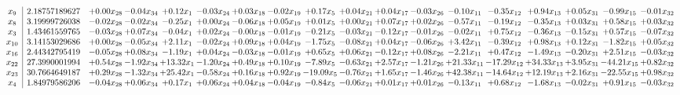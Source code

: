 \documentclass[9pt]{article}
\begin{document}
 \[\begin{array}{c| c c@{\hskip 2pt} c@{\hskip 2pt} c@{\hskip 2pt} c@{\hskip 2pt} c@{\hskip 2pt} c@{\hskip 2pt} c@{\hskip 2pt} c@{\hskip 2pt} c@{\hskip 2pt} c@{\hskip 2pt} c@{\hskip 2pt} c@{\hskip 2pt} c@{\hskip 2pt} c@{\hskip 2pt} c@{\hskip 2pt} c@{\hskip 2pt} }
 x_{9}   &  2.18757189627 & +  0.00 x_{28} & -0.04 x_{34} & +  0.12 x_{1} & -0.03 x_{24} & +  0.03 x_{18} & -0.02 x_{19} & +  0.17 x_{5} & +  0.04 x_{21} & +  0.04 x_{17} & -0.03 x_{26} & -0.10 x_{11} & -0.35 x_{12} & +  0.94 x_{13} & +  0.05 x_{31} & -0.99 x_{15} & -0.01 x_{32}\\
 x_{8}   &  3.19999726038 & -0.02 x_{28} & -0.02 x_{34} & -0.25 x_{1} & +  0.00 x_{24} & -0.06 x_{18} & +  0.05 x_{19} & +  0.01 x_{5} & +  0.00 x_{21} & +  0.07 x_{17} & +  0.02 x_{26} & -0.57 x_{11} & -0.19 x_{12} & -0.35 x_{13} & +  0.03 x_{31} & +  0.58 x_{15} & +  0.03 x_{32}\\
 x_{3}   &  1.43461559765 & -0.03 x_{28} & +  0.07 x_{34} & -0.04 x_{1} & +  0.02 x_{24} & -0.00 x_{18} & -0.01 x_{19} & -0.21 x_{5} & -0.03 x_{21} & -0.12 x_{17} & -0.01 x_{26} & -0.02 x_{11} & +  0.75 x_{12} & -0.36 x_{13} & -0.15 x_{31} & +  0.57 x_{15} & -0.07 x_{32}\\
 x_{10}   &  3.14153029686 & +  0.00 x_{28} & -0.05 x_{34} & +  2.11 x_{1} & -0.02 x_{24} & +  0.09 x_{18} & +  0.04 x_{19} & -1.75 x_{5} & -0.08 x_{21} & +  0.04 x_{17} & -0.06 x_{26} & +  3.42 x_{11} & -0.39 x_{12} & +  0.98 x_{13} & +  0.12 x_{31} & -1.82 x_{15} & +  0.05 x_{32}\\
 x_{16}   &  2.44342795419 & -0.05 x_{28} & +  0.08 x_{34} & -1.19 x_{1} & +  0.04 x_{24} & -0.03 x_{18} & -0.01 x_{19} & +  0.65 x_{5} & +  0.06 x_{21} & -0.12 x_{17} & +  0.08 x_{26} & -2.21 x_{11} & +  0.47 x_{12} & -1.49 x_{13} & -0.20 x_{31} & +  2.51 x_{15} & -0.03 x_{32}\\
 x_{22}   &  27.3990001994 & +  0.54 x_{28} & -1.92 x_{34} & + 13.32 x_{1} & -1.20 x_{24} & +  0.49 x_{18} & +  0.10 x_{19} & -7.89 x_{5} & -0.63 x_{21} & +  2.57 x_{17} & -1.21 x_{26} & + 21.33 x_{11} & -17.29 x_{12} & + 34.33 x_{13} & +  3.95 x_{31} & -44.21 x_{15} & +  0.82 x_{32}\\
 x_{23}   &  30.7664649187 & +  0.29 x_{28} & -1.32 x_{34} & + 25.42 x_{1} & -0.58 x_{24} & +  0.16 x_{18} & +  0.92 x_{19} & -19.09 x_{5} & -0.76 x_{21} & +  1.65 x_{17} & -1.46 x_{26} & + 42.38 x_{11} & -14.64 x_{12} & + 12.19 x_{13} & +  2.16 x_{31} & -22.55 x_{15} & +  0.98 x_{32}\\
 x_{4}   &  1.84979586206 & -0.04 x_{28} & +  0.06 x_{34} & +  0.17 x_{1} & +  0.06 x_{24} & +  0.04 x_{18} & -0.04 x_{19} & -0.84 x_{5} & -0.06 x_{21} & +  0.01 x_{17} & +  0.01 x_{26} & -0.13 x_{11} & +  0.68 x_{12} & -1.68 x_{13} & -0.02 x_{31} & +  0.91 x_{15} & -0.03 x_{32}\\

\end{array}\]
\end{document}

